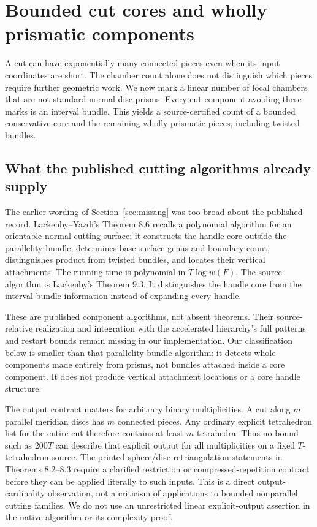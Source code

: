 \section{Bounded cut cores and wholly prismatic components}
\label{sec:cut-products}

A cut can have exponentially many connected pieces even when its input
coordinates are short. The chamber count alone does not distinguish which
pieces require further geometric work. We now mark a linear number of local
chambers that are not standard normal-disc prisms. Every cut component
avoiding these marks is an interval bundle. This yields a source-certified
count of a bounded conservative core and the remaining wholly prismatic
pieces, including twisted bundles.

\subsection{What the published cutting algorithms already supply}

The earlier wording of Section~\ref{sec:missing} was too broad about the
published record. Lackenby--Yazdi's Theorem 8.6\cite{lackenby-yazdi-genus}
recalls a polynomial algorithm for an orientable normal cutting surface:
it constructs the handle core outside the parallelity bundle, determines
base-surface genus and boundary count, distinguishes product from twisted
bundles, and locates their vertical attachments. The running time is
polynomial in $T\log w(F)$. The source algorithm is Lackenby's
Theorem 9.3\cite{lackenby-parallelity}. It distinguishes the handle core
from the interval-bundle information instead of expanding every handle.

These are published component algorithms, not absent theorems. Their
source-relative realization and integration with the accelerated hierarchy's
full patterns and restart bounds remain missing in our implementation.
Our classification below is smaller than that parallelity-bundle algorithm:
it detects whole components made entirely from prisms, not bundles attached
inside a core component. It does not produce vertical attachment locations
or a core handle structure.


The output contract matters for arbitrary binary multiplicities. A cut
along $m$ parallel meridian discs has $m$ connected pieces. Any ordinary
explicit tetrahedron list for the entire cut therefore contains at least
$m$ tetrahedra. Thus no bound such as $200T$ can describe that explicit
output for all multiplicities on a fixed $T$-tetrahedron source. The printed
sphere/disc retriangulation statements in Theorems 8.2--8.3 require a clarified
restriction or compressed-repetition contract before they can be applied
literally to such inputs. This is a direct output-cardinality observation,
not a criticism of applications to bounded nonparallel cutting families.
We do not use an unrestricted linear explicit-output assertion in the native
algorithm or its complexity proof.


